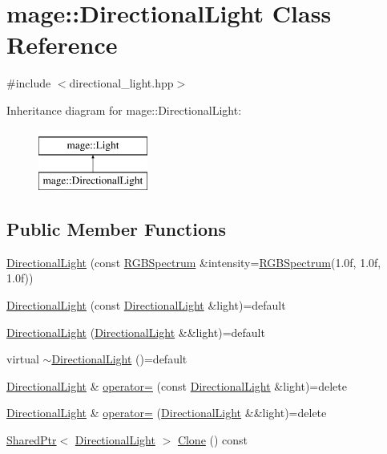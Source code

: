 \hypertarget{classmage_1_1_directional_light}{}\section{mage\+:\+:Directional\+Light Class Reference}
\label{classmage_1_1_directional_light}


{\ttfamily \#include $<$directional\+\_\+light.\+hpp$>$}

Inheritance diagram for mage\+:\+:Directional\+Light\+:\begin{figure}[H]
\begin{center}
\leavevmode
\includegraphics[height=2.000000cm]{classmage_1_1_directional_light}
\end{center}
\end{figure}
\subsection*{Public Member Functions}
\begin{DoxyCompactItemize}
\item 
\hyperlink{classmage_1_1_directional_light_a67df04219f61a8350045e5743b1de284}{Directional\+Light} (const \hyperlink{structmage_1_1_r_g_b_spectrum}{R\+G\+B\+Spectrum} \&intensity=\hyperlink{structmage_1_1_r_g_b_spectrum}{R\+G\+B\+Spectrum}(1.\+0f, 1.\+0f, 1.\+0f))
\item 
\hyperlink{classmage_1_1_directional_light_a6939817ef5aeb6347d6d1aa963241f49}{Directional\+Light} (const \hyperlink{classmage_1_1_directional_light}{Directional\+Light} \&light)=default
\item 
\hyperlink{classmage_1_1_directional_light_a61dfbcff7faae4ec2f24b9d4f30c7720}{Directional\+Light} (\hyperlink{classmage_1_1_directional_light}{Directional\+Light} \&\&light)=default
\item 
virtual \hyperlink{classmage_1_1_directional_light_a08f8d1a4b38d18aa4735ddda7d6e0f51}{$\sim$\+Directional\+Light} ()=default
\item 
\hyperlink{classmage_1_1_directional_light}{Directional\+Light} \& \hyperlink{classmage_1_1_directional_light_a36df91928dfdb33d3e333d8c51332462}{operator=} (const \hyperlink{classmage_1_1_directional_light}{Directional\+Light} \&light)=delete
\item 
\hyperlink{classmage_1_1_directional_light}{Directional\+Light} \& \hyperlink{classmage_1_1_directional_light_a7076a654314a40f873f0f0d1e411845f}{operator=} (\hyperlink{classmage_1_1_directional_light}{Directional\+Light} \&\&light)=delete
\item 
\hyperlink{namespacemage_a1e01ae66713838a7a67d30e44c67703e}{Shared\+Ptr}$<$ \hyperlink{classmage_1_1_directional_light}{Directional\+Light} $>$ \hyperlink{classmage_1_1_directional_light_af68699d987bbb1170f76cdfe8bdf8c1d}{Clone} () const
\end{DoxyCompactItemize}
